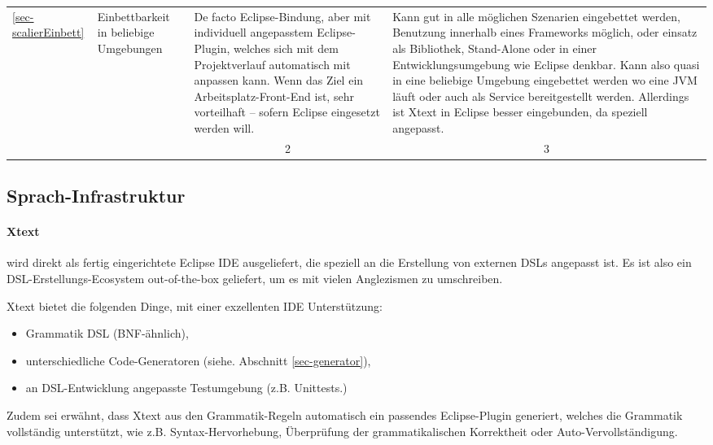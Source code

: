 \begin{landscape}
\begin{longtable}{|p{0.8cm}|p{4.4cm}|p{6.4cm}|p{6.4cm}|}
  \ref{sec-scalierEinbett}
  & Einbettbarkeit in beliebige Umgebungen
  & De facto Eclipse-Bindung, aber mit individuell angepasstem Eclipse-Plugin,
    welches sich mit dem Projektverlauf automatisch mit anpassen kann.
    Wenn das Ziel ein Arbeitsplatz-Front-End ist, sehr vorteilhaft -- sofern
    Eclipse eingesetzt werden will.
  & Kann gut in alle möglichen Szenarien eingebettet werden, Benutzung
    innerhalb eines Frameworks möglich, oder einsatz als Bibliothek,
    Stand-Alone oder in einer Entwicklungsumgebung wie Eclipse denkbar.
    Kann also quasi in eine beliebige Umgebung eingebettet werden
    wo eine JVM läuft oder auch als Service bereitgestellt werden.
    Allerdings ist Xtext in Eclipse besser eingebunden, da speziell angepasst.
  \\
  \cline{3-4}
  & & \multicolumn{1}{c|}{ 2 } & \multicolumn{1}{c|}{ 3 } \\ \hline

\end{longtable}
\newpage
\end{landscape}


\subsection{Sprach-Infrastruktur}\label{sec-infrastruktur}

\paragraph{Xtext} wird direkt als fertig eingerichtete Eclipse IDE
ausgeliefert, die speziell an die Erstellung von externen DSLs angepasst
ist. Es ist also ein DSL-Erstellungs-Ecosystem out-of-the-box geliefert,
um es mit vielen Anglezismen zu umschreiben.

Xtext bietet die folgenden Dinge, mit einer exzellenten IDE Unterstützung:

\begin{itemize}
  \item Grammatik DSL (BNF-ähnlich),
  \item unterschiedliche Code-Generatoren (siehe. Abschnitt \ref{sec-generator}),
  \item an DSL-Entwicklung angepasste Testumgebung (z.B. Unittests.)
\end{itemize}

Zudem sei erwähnt, dass Xtext aus den Grammatik-Regeln automatisch ein
passendes Eclipse-Plugin generiert, welches die Grammatik vollständig
unterstützt, wie z.B. Syntax-Hervorhebung, Überprüfung der grammatikalischen
Korrektheit oder Auto-Vervollständigung.

